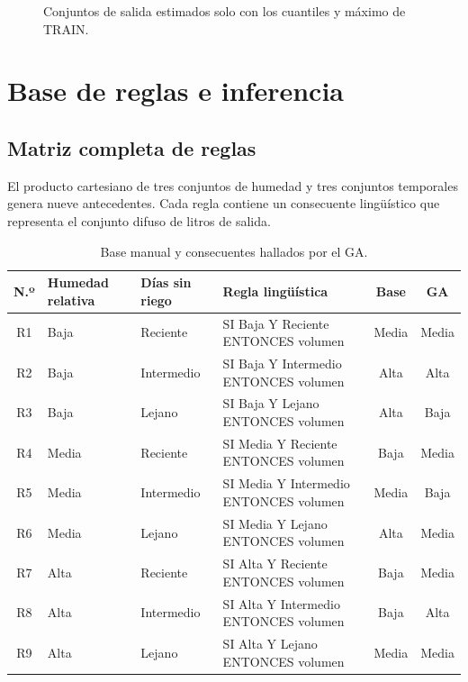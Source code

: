 \documentclass[11pt,letterpaper]{article}
\begin{document}
\begin{figure}[H]
\centering
{}
\caption{Conjuntos de salida estimados solo con los cuantiles y máximo de TRAIN.}\label{fig:mf-salida}
\end{figure}

\section{Base de reglas e inferencia}
\subsection{Matriz completa de reglas}
El producto cartesiano de tres conjuntos de humedad y tres conjuntos temporales genera nueve antecedentes. Cada regla contiene un consecuente lingüístico que representa el conjunto difuso de litros de salida.

\begin{table}[H]
\centering\small
\caption{Base manual y consecuentes hallados por el GA.}\label{tab:matriz-reglas}
\begin{tabularx}{\textwidth}{c l l X c c}
\toprule
N.º & Humedad relativa & Días sin riego & Regla lingüística & Base & GA\\
\midrule
R1 & Baja & Reciente & SI Baja Y Reciente ENTONCES volumen & Media & Media\\
R2 & Baja & Intermedio & SI Baja Y Intermedio ENTONCES volumen & Alta & Alta\\
R3 & Baja & Lejano & SI Baja Y Lejano ENTONCES volumen & Alta & Baja\\
R4 & Media & Reciente & SI Media Y Reciente ENTONCES volumen & Baja & Media\\
R5 & Media & Intermedio & SI Media Y Intermedio ENTONCES volumen & Media & Baja\\
R6 & Media & Lejano & SI Media Y Lejano ENTONCES volumen & Alta & Media\\
R7 & Alta & Reciente & SI Alta Y Reciente ENTONCES volumen & Baja & Media\\
R8 & Alta & Intermedio & SI Alta Y Intermedio ENTONCES volumen & Baja & Alta\\
R9 & Alta & Lejano & SI Alta Y Lejano ENTONCES volumen & Media & Media\\
\bottomrule
\end{tabularx}
\end{table}
\end{document}
